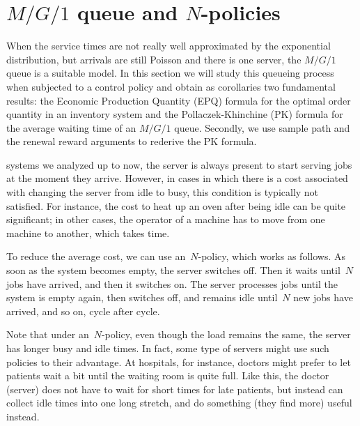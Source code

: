 \documentclass[queueing-book.tex]{subfiles}
\begin{document}
\section{\texorpdfstring{$M/G/1$}{MG1} queue and \texorpdfstring{$N$}{N}-policies}
\label{sec:n-policies-mg1}



When the service times are not really well approximated by the exponential distribution, but arrivals are still Poisson and there is one server, the $M/G/1$ queue is a suitable model.
In this section we will study this queueing process when subjected to a control policy and obtain as corollaries two fundamental results: the Economic Production Quantity (EPQ) formula for the optimal order quantity in an inventory system and the Pollaczek-Khinchine (PK) formula for the average waiting time of an $M/G/1$ queue.
Secondly, we use sample path and the renewal reward arguments to rederive the PK formula.



 systems we analyzed up to now, the server is always present to start serving jobs at the moment they arrive.
However, in cases in which there is a cost associated with changing the server from idle to busy, this condition is typically not satisfied.
For instance, the cost to heat up an oven after being idle can be quite significant; in other cases, the operator of a machine has to move from one machine to another, which takes time.



To reduce the average cost, we can use an~$N$-policy, which works as follows.
As soon as the system becomes empty, the server switches off.
Then it waits until~$N$ jobs have arrived, and then it switches on.
The server processes jobs until the system is empty again, then switches off, and remains idle until~$N$ new jobs have arrived, and so on, cycle after cycle.

Note that under an~$N$-policy, even though the load remains the same, the server has longer busy and idle times.
In fact, some type of servers might use such policies to their advantage.
At hospitals, for instance, doctors might prefer to let patients wait a bit until the waiting room is quite full.
Like this, the doctor (server) does not have to wait for short times for late patients, but instead can collect idle times into one long stretch, and do something (they find more) useful instead.
\end{document}
